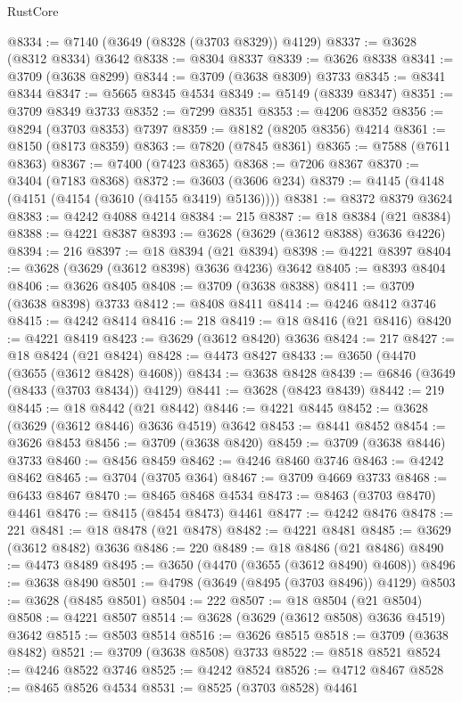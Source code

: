 \begin{lexlean}{RustCore}
\begin{coremodule}
@8334 := @7140 (@3649 (@8328 (@3703 @8329)) @4129)
@8337 := @3628 (@8312 @8334) @3642
@8338 := @8304 @8337
@8339 := @3626 @8338
@8341 := @3709 (@3638 @8299)
@8344 := @3709 (@3638 @8309) @3733
@8345 := @8341 @8344
@8347 := @5665 @8345 @4534
@8349 := @5149 (@8339 @8347)
@8351 := @3709 @8349 @3733
@8352 := @7299 @8351
@8353 := @4206 @8352
@8356 := @8294 (@3703 @8353) @7397
@8359 := @8182 (@8205 @8356) @4214
@8361 := @8150 (@8173 @8359)
@8363 := @7820 (@7845 @8361)
@8365 := @7588 (@7611 @8363)
@8367 := @7400 (@7423 @8365)
@8368 := @7206 @8367
@8370 := @3404 (@7183 @8368)
@8372 := @3603 (@3606 @234)
@8379 := @4145 (@4148 (@4151 (@4154 (@3610 (@4155 @3419) @5136))))
@8381 := @8372 @8379 @3624
@8383 := @4242 @4088 @4214
@8384 := 215
@8387 := @18 @8384 (@21 @8384)
@8388 := @4221 @8387
@8393 := @3628 (@3629 (@3612 @8388) @3636 @4226)
@8394 := 216
@8397 := @18 @8394 (@21 @8394)
@8398 := @4221 @8397
@8404 := @3628 (@3629 (@3612 @8398) @3636 @4236) @3642
@8405 := @8393 @8404
@8406 := @3626 @8405
@8408 := @3709 (@3638 @8388)
@8411 := @3709 (@3638 @8398) @3733
@8412 := @8408 @8411
@8414 := @4246 @8412 @3746
@8415 := @4242 @8414
@8416 := 218
@8419 := @18 @8416 (@21 @8416)
@8420 := @4221 @8419
@8423 := @3629 (@3612 @8420) @3636
@8424 := 217
@8427 := @18 @8424 (@21 @8424)
@8428 := @4473 @8427
@8433 := @3650 (@4470 (@3655 (@3612 @8428) @4608))
@8434 := @3638 @8428
@8439 := @6846 (@3649 (@8433 (@3703 @8434)) @4129)
@8441 := @3628 (@8423 @8439)
@8442 := 219
@8445 := @18 @8442 (@21 @8442)
@8446 := @4221 @8445
@8452 := @3628 (@3629 (@3612 @8446) @3636 @4519) @3642
@8453 := @8441 @8452
@8454 := @3626 @8453
@8456 := @3709 (@3638 @8420)
@8459 := @3709 (@3638 @8446) @3733
@8460 := @8456 @8459
@8462 := @4246 @8460 @3746
@8463 := @4242 @8462
@8465 := @3704 (@3705 @364)
@8467 := @3709 @4669 @3733
@8468 := @6433 @8467
@8470 := @8465 @8468 @4534
@8473 := @8463 (@3703 @8470) @4461
@8476 := @8415 (@8454 @8473) @4461
@8477 := @4242 @8476
@8478 := 221
@8481 := @18 @8478 (@21 @8478)
@8482 := @4221 @8481
@8485 := @3629 (@3612 @8482) @3636
@8486 := 220
@8489 := @18 @8486 (@21 @8486)
@8490 := @4473 @8489
@8495 := @3650 (@4470 (@3655 (@3612 @8490) @4608))
@8496 := @3638 @8490
@8501 := @4798 (@3649 (@8495 (@3703 @8496)) @4129)
@8503 := @3628 (@8485 @8501)
@8504 := 222
@8507 := @18 @8504 (@21 @8504)
@8508 := @4221 @8507
@8514 := @3628 (@3629 (@3612 @8508) @3636 @4519) @3642
@8515 := @8503 @8514
@8516 := @3626 @8515
@8518 := @3709 (@3638 @8482)
@8521 := @3709 (@3638 @8508) @3733
@8522 := @8518 @8521
@8524 := @4246 @8522 @3746
@8525 := @4242 @8524
@8526 := @4712 @8467
@8528 := @8465 @8526 @4534
@8531 := @8525 (@3703 @8528) @4461

\end{coremodule}
\end{lexlean}
